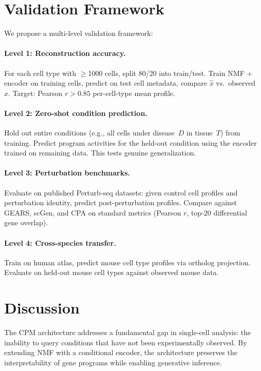 \documentclass[10pt,twocolumn,letterpaper]{article}
\begin{document}
\section{Validation Framework}
\label{sec:validation}

We propose a multi-level validation framework:

\paragraph{Level 1: Reconstruction accuracy.}
For each cell type with $\geq$1000 cells, split 80/20 into train/test. Train
NMF + encoder on training cells, predict on test cell metadata, compare
$\hat{x}$ vs.\ observed~$x$. Target: Pearson $r > 0.85$ per-cell-type mean
profile.

\paragraph{Level 2: Zero-shot condition prediction.}
Hold out entire conditions (e.g., all cells under disease~$D$ in tissue~$T$)
from training. Predict program activities for the held-out condition using the
encoder trained on remaining data. This tests genuine generalization.

\paragraph{Level 3: Perturbation benchmarks.}
Evaluate on published Perturb-seq datasets: given control cell profiles and
perturbation identity, predict post-perturbation profiles. Compare against
GEARS, scGen, and CPA on standard metrics (Pearson $r$, top-20 differential
gene overlap).

\paragraph{Level 4: Cross-species transfer.}
Train on human atlas, predict mouse cell type profiles via ortholog projection.
Evaluate on held-out mouse cell types against observed mouse data.

\section{Discussion}
\label{sec:discussion}

The CPM architecture addresses a fundamental gap in single-cell analysis: the
inability to query conditions that have not been experimentally observed. By
extending NMF with a conditional encoder, the architecture preserves the
interpretability of gene programs while enabling generative inference.
\end{document}

